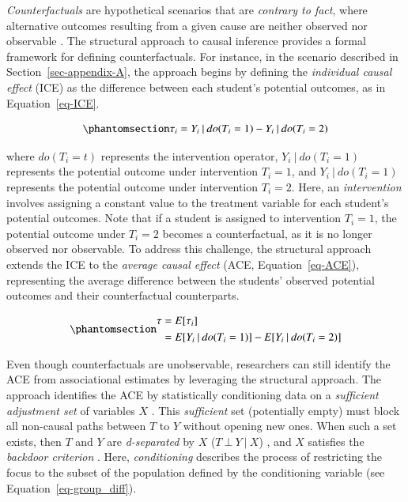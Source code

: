 \documentclass[
  authoryear,
  review,
  1p]{elsarticle}
\begin{document}
\emph{Counterfactuals} are hypothetical scenarios that are
\emph{contrary to fact}, where alternative outcomes resulting from a
given cause are neither observed nor observable
\citep{Neal_2020, Counterfactual_2024}. The structural approach to
causal inference \citep{Pearl_2009, Pearl_et_al_2016} provides a formal
framework for defining counterfactuals. For instance, in the scenario
described in Section~\ref{sec-appendix-A}, the approach begins by
defining the \emph{individual causal effect} (ICE) as the difference
between each student's potential outcomes, as in Equation~\ref{eq-ICE}.

\begin{equation}\phantomsection\label{eq-ICE}{
\tau_{i} = Y_{i} \:|\:do(T_{i}=1) - Y_{i} \:|\:do(T_{i}=2)
}\end{equation}

where \(do(T_{i}=t)\) represents the intervention operator,
\(Y_{i} \:|\:do(T_{i}=1)\) represents the potential outcome under
intervention \(T_{i}=1\), and \(Y_{i} \:|\:do(T_{i}=1)\) represents the
potential outcome under intervention \(T_{i}=2\). Here, an
\emph{intervention} involves assigning a constant value to the treatment
variable for each student's potential outcomes. Note that if a student
is assigned to intervention \(T_{i}=1\), the potential outcome under
\(T_{i}=2\) becomes a counterfactual, as it is no longer observed nor
observable. To address this challenge, the structural approach extends
the ICE to the \emph{average causal effect} (ACE,
Equation~\ref{eq-ACE}), representing the average difference between the
students' observed potential outcomes and their counterfactual
counterparts.

\begin{equation}\phantomsection\label{eq-ACE}{
\begin{aligned}
\tau & = E[\tau_{i}] \\
  & = E[Y_{i} \:|\:do(T_{i}=1)]- E[Y_{i} \:|\:do(T_{i}=2)]
\end{aligned}
}\end{equation}

Even though counterfactuals are unobservable, researchers can still
identify the ACE from associational estimates by leveraging the
structural approach. The approach identifies the ACE by statistically
conditioning data on a \emph{sufficient adjustment set} of variables
\(X\) \citep{Pearl_2009, Pearl_et_al_2016, Morgan_et_al_2014}. This
\emph{sufficient} set (potentially empty) must block all non-causal
paths between \(T\) to \(Y\) without opening new ones. When such a set
exists, then \(T\) and \(Y\) are \emph{d-separated} by \(X\)
(\(T \:\bot\:Y \:|\:X\)) \citep{Pearl_2009}, and \(X\) satisfies the
\emph{backdoor criterion} \citep[pp 37]{Neal_2020}. Here,
\emph{conditioning} describes the process of restricting the focus to
the subset of the population defined by the conditioning variable
\citep[pp.~32]{Neal_2020} (see Equation~\ref{eq-group_diff}).
\end{document}
